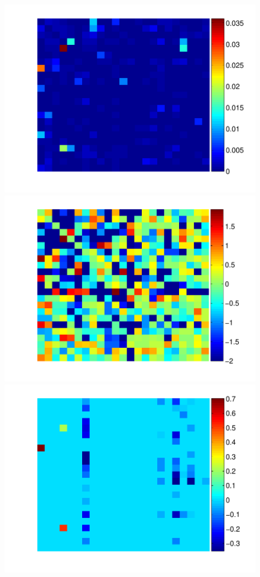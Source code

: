 \begin{figure}[h]
\begin{minipage}[c]{0.3\hsize}
\includegraphics[width=\hsize]{../figs/FigureA11_real_Xcorr}
\end{minipage}
\begin{minipage}[c]{0.3\hsize}
\includegraphics[width=\hsize]{../figs/FigureA11_real_glm}
\end{minipage}
\begin{minipage}[c]{0.3\hsize}
\includegraphics[width=\hsize]{../figs/FigureA11_real_sparse}

\end{minipage}
\end{figure}
